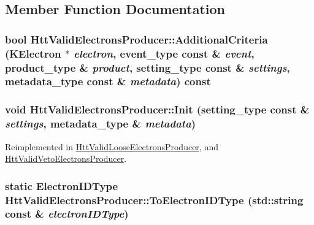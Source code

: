 \subsection{Member Function Documentation}
\hypertarget{classHttValidElectronsProducer_aba4230bf7a962a9a18a03433aaa3d3ec}{
\subsubsection[{AdditionalCriteria}]{\setlength{\rightskip}{0pt plus 5cm}bool HttValidElectronsProducer::AdditionalCriteria (KElectron $\ast$ {\em electron}, \/  event\_\-type const \& {\em event}, \/  product\_\-type \& {\em product}, \/  setting\_\-type const \& {\em settings}, \/  metadata\_\-type const \& {\em metadata}) const}}
\label{classHttValidElectronsProducer_aba4230bf7a962a9a18a03433aaa3d3ec}
\hypertarget{classHttValidElectronsProducer_ae10e80f0e540bbf1d1e85a141b530bd7}{
\subsubsection[{Init}]{\setlength{\rightskip}{0pt plus 5cm}void HttValidElectronsProducer::Init (setting\_\-type const \& {\em settings}, \/  metadata\_\-type \& {\em metadata})}}
\label{classHttValidElectronsProducer_ae10e80f0e540bbf1d1e85a141b530bd7}


Reimplemented in \hyperlink{classHttValidLooseElectronsProducer_a5eadcc58c3d058258eb36c9d4ec17aa9}{HttValidLooseElectronsProducer}, and \hyperlink{classHttValidVetoElectronsProducer_acba0b3d8e9aad0dda1c8f438b51cc262}{HttValidVetoElectronsProducer}.\hypertarget{classHttValidElectronsProducer_a4280849eaeb101017cbe0a49d4b68311}{
\subsubsection[{ToElectronIDType}]{\setlength{\rightskip}{0pt plus 5cm}static {\bf ElectronIDType} HttValidElectronsProducer::ToElectronIDType (std::string const \& {\em electronIDType})}}
\label{classHttValidElectronsProducer_a4280849eaeb101017cbe0a49d4b68311}


